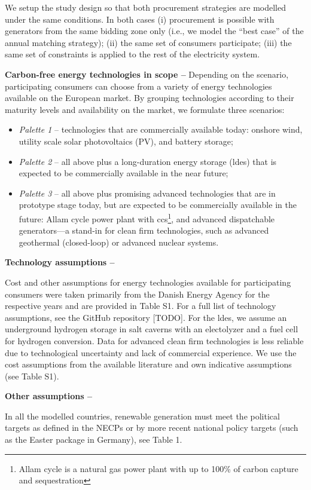 We setup the study design so that both procurement strategies are modelled under the same conditions.
In both cases (i) procurement is possible with generators from the same bidding zone only (i.e., we model the \enquote{best case} of the annual matching strategy); (ii) the same set of consumers participate; (iii) the same set of constraints is applied to the rest of the electricity system.

\textbf{Carbon-free energy technologies in scope --} Depending on the scenario, participating consumers can choose from a variety of energy technologies available on the European market. By grouping technologies according to their maturity levels and availability on the market, we formulate three scenarios:

\begin{itemize}[-]
    \item \textit{Palette 1} -- technologies that are commercially available today: onshore wind, utility scale solar photovoltaics (\gls{PV}), and battery storage;
    \item \textit{Palette 2} -- all above plus a long-duration energy storage (\gls{ldes}) that is expected to be commercially available in the near future; 
    \item \textit{Palette 3} -- all above plus promising advanced technologies that are in prototype stage today, but are expected to be commercially available in the future: Allam cycle power plant with \gls{ccs}\footnote{Allam cycle is a natural gas power plant with up to 100\% of carbon capture and sequestration}, and advanced dispatchable generators---a stand-in for clean firm technologies, such as advanced geothermal (closed-loop) or advanced nuclear systems.
\end{itemize}


\textbf{Technology assumptions --} 

Cost and other assumptions for energy technologies available for participating consumers were taken primarily from the Danish Energy Agency \cite{DEA-technologydata} for the respective years and are provided in Table S1. 
For a full list of technology assumptions, see the GitHub repository [TODO]. 
For the \gls{ldes}, we assume an underground hydrogen storage in salt caverns with an electolyzer and a fuel cell for hydrogen conversion. 
Data for advanced clean firm technologies is less reliable due to technological uncertainty and lack of commercial experience. 
We use the cost assumptions from the available literature and own indicative assumptions (see Table S1).

\textbf{Other assumptions --} 

In all the modelled countries, renewable generation must meet the political targets as defined in the NECPs or by more recent national policy targets (such as the Easter
package in Germany), see Table 1.